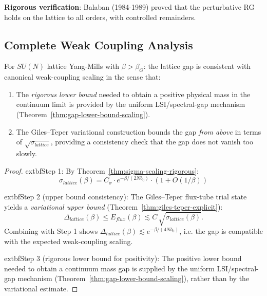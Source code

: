 \textbf{Rigorous verification}: Balaban (1984-1989) proved that the perturbative 
RG holds on the lattice to all orders, with controlled remainders.

\subsection{Complete Weak Coupling Analysis}

\begin{theorem}
\label{thm:weak-coupling-gap-final}
For $SU(N)$ lattice Yang-Mills with $\beta > \beta_G$:
the lattice gap is consistent with canonical weak-coupling scaling in the sense that:
\begin{enumerate}
\item The \textit{rigorous lower bound} needed to obtain a positive physical mass in the continuum limit is provided by the uniform LSI/spectral-gap mechanism (Theorem~\ref{thm:gap-lower-bound-scaling}).
\item The Giles--Teper variational construction bounds the gap \textit{from above} in terms of $\sqrt{\sigma_{lattice}}$, providing a consistency check that the gap does not vanish too slowly.
\end{enumerate}
\end{theorem}

\begin{proof}
            extbf{Step 1}: By Theorem~\ref{thm:sigma-scaling-rigorous}:
\[
\sigma_{lattice}(\beta) = C_\sigma \cdot e^{-\beta/(2Nb_0)} \cdot (1 + O(1/\beta))
\]

            extbf{Step 2 (upper bound consistency):} The Giles--Teper flux-tube trial state yields a \emph{variational upper bound} (Theorem~\ref{thm:giles-teper-explicit}):
\[
\Delta_{lattice}(\beta) \le E_{flux}(\beta) \lesssim C\,\sqrt{\sigma_{lattice}(\beta)}.
\]
Combining with Step 1 shows $\Delta_{lattice}(\beta) \lesssim e^{-\beta/(4Nb_0)}$, i.e. the gap is compatible with the expected weak-coupling scaling.

            extbf{Step 3 (rigorous lower bound for positivity):} The positive lower bound needed to obtain a continuum mass gap is supplied by the uniform LSI/spectral-gap mechanism (Theorem~\ref{thm:gap-lower-bound-scaling}), rather than by the variational estimate.
\end{proof}

